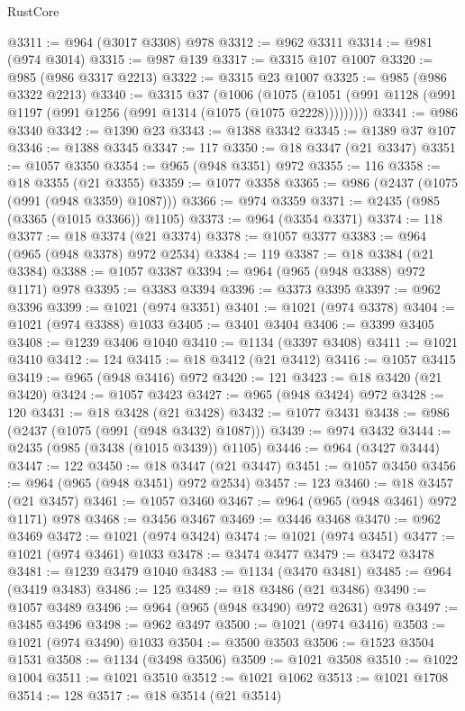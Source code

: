 \begin{lexlean}{RustCore}
\begin{coremodule}
@3311 := @964 (@3017 @3308) @978
@3312 := @962 @3311
@3314 := @981 (@974 @3014)
@3315 := @987 @139
@3317 := @3315 @107 @1007
@3320 := @985 (@986 @3317 @2213)
@3322 := @3315 @23 @1007
@3325 := @985 (@986 @3322 @2213)
@3340 := @3315
    @37
    (@1006
      (@1075 (@1051 (@991 @1128 (@991 @1197 (@991 @1256 (@991 @1314 (@1075 (@1075 @2228)))))))))
@3341 := @986 @3340
@3342 := @1390 @23
@3343 := @1388 @3342
@3345 := @1389 @37 @107
@3346 := @1388 @3345
@3347 := 117
@3350 := @18 @3347 (@21 @3347)
@3351 := @1057 @3350
@3354 := @965 (@948 @3351) @972
@3355 := 116
@3358 := @18 @3355 (@21 @3355)
@3359 := @1077 @3358
@3365 := @986 (@2437 (@1075 (@991 (@948 @3359) @1087)))
@3366 := @974 @3359
@3371 := @2435 (@985 (@3365 (@1015 @3366)) @1105)
@3373 := @964 (@3354 @3371)
@3374 := 118
@3377 := @18 @3374 (@21 @3374)
@3378 := @1057 @3377
@3383 := @964 (@965 (@948 @3378) @972 @2534)
@3384 := 119
@3387 := @18 @3384 (@21 @3384)
@3388 := @1057 @3387
@3394 := @964 (@965 (@948 @3388) @972 @1171) @978
@3395 := @3383 @3394
@3396 := @3373 @3395
@3397 := @962 @3396
@3399 := @1021 (@974 @3351)
@3401 := @1021 (@974 @3378)
@3404 := @1021 (@974 @3388) @1033
@3405 := @3401 @3404
@3406 := @3399 @3405
@3408 := @1239 @3406 @1040
@3410 := @1134 (@3397 @3408)
@3411 := @1021 @3410
@3412 := 124
@3415 := @18 @3412 (@21 @3412)
@3416 := @1057 @3415
@3419 := @965 (@948 @3416) @972
@3420 := 121
@3423 := @18 @3420 (@21 @3420)
@3424 := @1057 @3423
@3427 := @965 (@948 @3424) @972
@3428 := 120
@3431 := @18 @3428 (@21 @3428)
@3432 := @1077 @3431
@3438 := @986 (@2437 (@1075 (@991 (@948 @3432) @1087)))
@3439 := @974 @3432
@3444 := @2435 (@985 (@3438 (@1015 @3439)) @1105)
@3446 := @964 (@3427 @3444)
@3447 := 122
@3450 := @18 @3447 (@21 @3447)
@3451 := @1057 @3450
@3456 := @964 (@965 (@948 @3451) @972 @2534)
@3457 := 123
@3460 := @18 @3457 (@21 @3457)
@3461 := @1057 @3460
@3467 := @964 (@965 (@948 @3461) @972 @1171) @978
@3468 := @3456 @3467
@3469 := @3446 @3468
@3470 := @962 @3469
@3472 := @1021 (@974 @3424)
@3474 := @1021 (@974 @3451)
@3477 := @1021 (@974 @3461) @1033
@3478 := @3474 @3477
@3479 := @3472 @3478
@3481 := @1239 @3479 @1040
@3483 := @1134 (@3470 @3481)
@3485 := @964 (@3419 @3483)
@3486 := 125
@3489 := @18 @3486 (@21 @3486)
@3490 := @1057 @3489
@3496 := @964 (@965 (@948 @3490) @972 @2631) @978
@3497 := @3485 @3496
@3498 := @962 @3497
@3500 := @1021 (@974 @3416)
@3503 := @1021 (@974 @3490) @1033
@3504 := @3500 @3503
@3506 := @1523 @3504 @1531
@3508 := @1134 (@3498 @3506)
@3509 := @1021 @3508
@3510 := @1022 @1004
@3511 := @1021 @3510
@3512 := @1021 @1062
@3513 := @1021 @1708
@3514 := 128
@3517 := @18 @3514 (@21 @3514)

\end{coremodule}
\end{lexlean}
